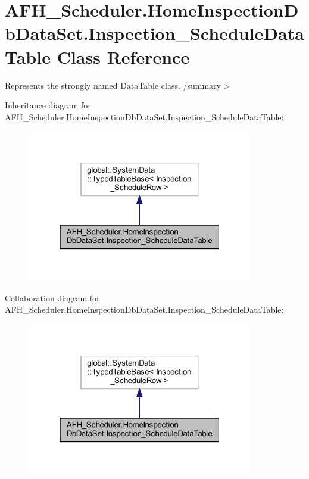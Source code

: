 \section{A\+F\+H\+\_\+\+Scheduler.\+Home\+Inspection\+Db\+Data\+Set.\+Inspection\+\_\+\+Schedule\+Data\+Table Class Reference}
\label{class_a_f_h___scheduler_1_1_home_inspection_db_data_set_1_1_inspection___schedule_data_table}


Represents the strongly named Data\+Table class. /summary$>$  




Inheritance diagram for A\+F\+H\+\_\+\+Scheduler.\+Home\+Inspection\+Db\+Data\+Set.\+Inspection\+\_\+\+Schedule\+Data\+Table\+:
\nopagebreak
\begin{figure}[H]
\begin{center}
\leavevmode
\includegraphics[width=280pt]{class_a_f_h___scheduler_1_1_home_inspection_db_data_set_1_1_inspection___schedule_data_table__inherit__graph}
\end{center}
\end{figure}


Collaboration diagram for A\+F\+H\+\_\+\+Scheduler.\+Home\+Inspection\+Db\+Data\+Set.\+Inspection\+\_\+\+Schedule\+Data\+Table\+:
\nopagebreak
\begin{figure}[H]
\begin{center}
\leavevmode
\includegraphics[width=280pt]{class_a_f_h___scheduler_1_1_home_inspection_db_data_set_1_1_inspection___schedule_data_table__coll__graph}
\end{center}
\end{figure}
